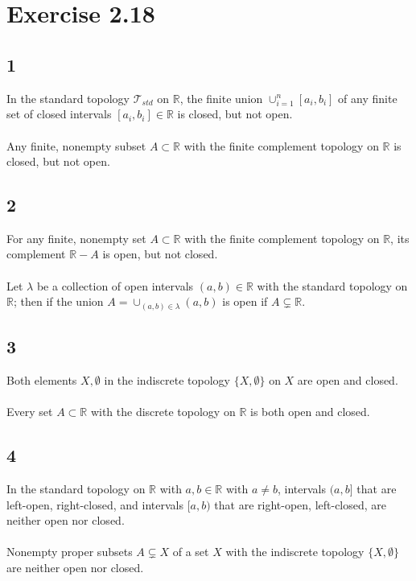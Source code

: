 \documentclass{article}
\begin{document}
\section*{Exercise 2.18}
\subsection*{1}
In the standard topology $\mathcal{T}_{std}$ on $\mathbb{R}$, the finite 
union $\cup_{i=1}^n [a_i, b_i]$ of any finite set of closed intervals $[a_i, b_i] \in \mathbb{R}$ 
is closed, but not open.\\ 
\\ 
Any finite, nonempty subset $A \subset \mathbb{R}$ with the finite complement topology on $\mathbb{R}$ 
is closed, but not open.

\subsection*{2}
For any finite, nonempty set $A \subset \mathbb{R}$ with the finite complement 
topology on $\mathbb{R}$, its complement $\mathbb{R} - A$ is open, but not closed.\\ 
\\ 
Let $\lambda$ be a collection of open intervals $(a, b) \in \mathbb{R}$ with the standard 
topology on $\mathbb{R}$; then if the union $A= \cup_{(a, b) \in \lambda} (a, b)$ is open
if $A \subsetneq \mathbb{R}$. 

\subsection*{3} 
Both elements $X, \emptyset$ in the indiscrete topology $\{X, \emptyset\}$ 
on $X$ are open and closed. \\ 
\\ 
Every set $A \subset \mathbb{R}$ with the discrete topology on $\mathbb{R}$ is 
both open and closed.

\subsection*{4}
In the standard topology on $\mathbb{R}$ with $a, b \in \mathbb{R}$ with $a \neq b$, intervals $(a, b]$ 
that are left-open, right-closed, and intervals $[a, b)$ that are right-open, left-closed, 
are neither open nor closed.\\ 
\\ 
Nonempty proper subsets $A \subsetneq X$ of a set $X$ with the indiscrete topology 
$\{X, \emptyset \}$ are neither open nor closed.
\end{document}
